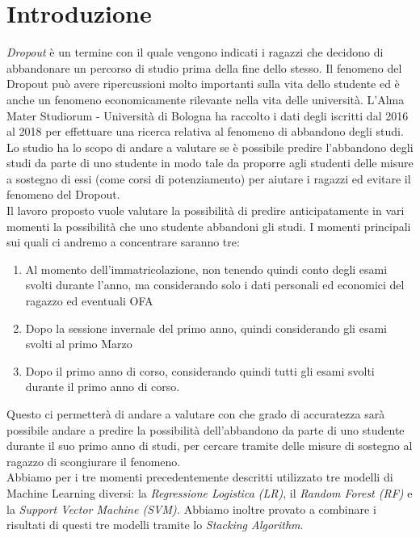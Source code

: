 \documentclass[../Report.tex]{subfiles}
\begin{document}
    \chapter{Introduzione}
        \emph{Dropout} è un termine con il quale vengono indicati i ragazzi che decidono di abbandonare un percorso di studio prima della fine dello stesso. Il fenomeno del Dropout può avere ripercussioni molto importanti sulla vita dello studente ed è anche un fenomeno economicamente rilevante nella vita delle università. L'Alma Mater Studiorum - Università di Bologna ha raccolto i dati degli iscritti dal 2016 al 2018 per effettuare una ricerca relativa al fenomeno di abbandono degli studi. Lo studio ha lo scopo di andare a valutare se è possibile predire l'abbandono degli studi da parte di uno studente in modo tale da proporre agli studenti delle misure a sostegno di essi (come corsi di potenziamento) per aiutare i ragazzi ed evitare il fenomeno del Dropout.\\ 
        Il lavoro proposto vuole valutare la possibilità di predire anticipatamente in vari momenti la possibilità che uno studente abbandoni gli studi. I momenti principali sui quali ci andremo a concentrare saranno tre:
        \begin{enumerate}
            \item Al momento dell'immatricolazione, non tenendo quindi conto degli esami svolti durante l'anno, ma considerando solo i dati personali ed economici del ragazzo ed eventuali OFA 
            \item Dopo la sessione invernale del primo anno, quindi considerando gli esami svolti al primo Marzo 
            \item Dopo il primo anno di corso, considerando quindi tutti gli esami svolti durante il primo anno di corso.
        \end{enumerate}
        Questo ci permetterà di andare a valutare con che grado di accuratezza sarà possibile andare a predire la possibilità dell'abbandono da parte di uno studente durante il suo primo anno di studi, per cercare tramite delle misure di sostegno al ragazzo di scongiurare il fenomeno.\\
        Abbiamo per i tre momenti precedentemente descritti utilizzato tre modelli di Machine Learning diversi: la \emph{Regressione Logistica (LR)}, il \emph{Random Forest (RF)} e la \emph{Support Vector Machine (SVM).} Abbiamo inoltre provato a combinare i risultati di questi tre modelli tramite lo \emph{Stacking Algorithm}.
        
\end{document}
